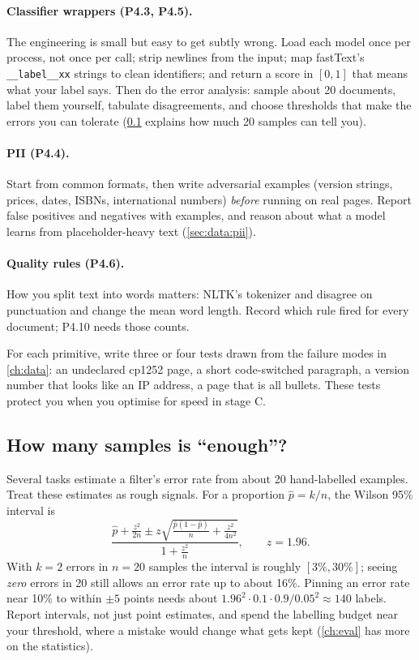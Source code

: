 \paragraph{Classifier wrappers (P4.3, P4.5).} The engineering is small but easy to get subtly wrong.
Load each model once per process, not once per call; strip newlines from the input; map fastText's
\texttt{\_\_label\_\_xx} strings to clean identifiers; and return a score in $[0,1]$ that means what
your label says. Then do the error analysis: sample about 20 documents, label them yourself, tabulate
disagreements, and choose thresholds that make the errors you can tolerate (\cref{sec:proj4:samples}
explains how much 20 samples can tell you).

\paragraph{PII (P4.4).} Start from common formats, then write adversarial examples (version strings,
prices, dates, ISBNs, international numbers) \emph{before} running on real pages. Report false positives
and negatives with examples, and reason about what a model learns from placeholder-heavy text
(\cref{sec:data:pii}).

\paragraph{Quality rules (P4.6).} How you split text into words matters: NLTK's tokenizer and
 disagree on punctuation and change the mean word length. Record which rule fired
for every document; P4.10 needs those counts.

\begin{keyidea}
For each primitive, write three or four tests drawn from the failure modes in \cref{ch:data}: an
undeclared cp1252 page, a short code-switched paragraph, a version number that looks like an IP
address, a page that is all bullets. These tests protect you when you optimise for speed in stage C.
\end{keyidea}

\subsection{How many samples is ``enough''?}\label{sec:proj4:samples}

Several tasks estimate a filter's error rate from about 20 hand-labelled examples. Treat these
estimates as rough signals. For a proportion $\hat p = k/n$, the Wilson 95\% interval is
\[
\frac{\hat p + \frac{z^2}{2n} \pm z\sqrt{\frac{\hat p(1-\hat p)}{n} + \frac{z^2}{4n^2}}}{1+\frac{z^2}{n}},
\qquad z = 1.96.
\]
With $k=2$ errors in $n=20$ samples the interval is roughly $[3\%, 30\%]$; seeing \emph{zero}
errors in 20 still allows an error rate up to about 16\%. Pinning an error rate near 10\% to within
$\pm5$ points needs about $1.96^2\cdot0.1\cdot0.9/0.05^2\approx140$ labels. Report intervals, not
just point estimates, and spend the labelling budget near your threshold, where a mistake would change
what gets kept (\cref{ch:eval} has more on the statistics).

